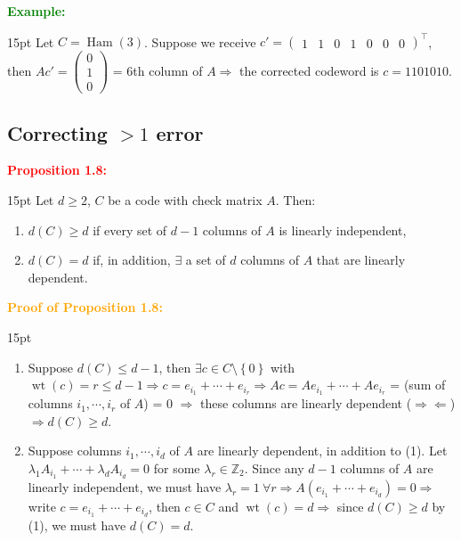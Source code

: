 \documentclass[12pt]{article}
\newcommand{\noparskip}{\vspace{-\parskip}}
\newenvironment{points}
	{\begin{enumerate}[label = (\arabic*)]}
	{\end{enumerate}}
\newenvironment{dent}
	{\begin{adjustwidth}{15pt}{}\noparskip}
	{\end{adjustwidth}}
\newenvironment{result}[1]
	{\textcolor{Red}{\textbf{#1:}}\begin{dent}}
	{\end{dent}}
\newenvironment{proof}[1]
	{\textcolor{Orange}{\textbf{Proof of #1:}}\begin{dent}}
	{\end{dent}}
\newenvironment{example}
	{\textcolor{Green}{\textbf{Example:}}\begin{dent}}
	{\end{dent}}
\renewcommand{\implies}{\Rightarrow}
\newcommand{\contradiction}{\Rightarrow \Leftarrow}
\newcommand{\set}[1]{\left\{ #1 \right\}}
\newcommand{\Z}{\mathbb{Z}}
\newcommand{\wt}[1]{\operatorname{wt}(#1)}
\newcommand{\Ham}[1]{\operatorname{Ham}(#1)}
\begin{document}
\begin{example}
Let $C = \Ham{3}$. Suppose we receive $c' = \begin{pmatrix} 1 & 1 & 0 & 1 & 0 & 0 & 0 \end{pmatrix}^\top$, then $Ac' = \begin{pmatrix} 0 \\ 1 \\ 0 \end{pmatrix}$ = 6th column of $A \implies$ the corrected codeword is $c = 1101010$.
\end{example}

\subsection{Correcting $> 1$ error}

\begin{result}{Proposition 1.8}
Let $d \ge 2$, $C$ be a code with check matrix $A$. Then:
\noparskip
\begin{points}
\item $d(C) \ge d$ if every set of $d - 1$ columns of $A$ is linearly independent,
\item $d(C) = d$ if, in addition, $\exists$ a set of $d$ columns of $A$ that are linearly dependent.
\end{points}
\end{result}

\begin{proof}{Proposition 1.8}
\begin{points}
\item Suppose $d(C) \le d - 1$, then $\exists c \in C \setminus \set{0}$ with $\wt{c} = r \le d - 1 \implies c = e_{i_1} + \cdots + e_{i_r} \implies Ac = Ae_{i_1} + \cdots + Ae_{i_r}$ = (sum of columns $i_1, \cdots, i_r$ of $A$) = 0 $\implies$ these columns are linearly dependent ($\contradiction$) $\implies d(C) \ge d$.
\item Suppose columns $i_1, \cdots, i_d$ of $A$ are linearly dependent, in addition to (1). Let $\lambda_1 A_{i_1} + \cdots + \lambda_d A_{i_d} = 0$ for some $\lambda_r \in \Z_2$. Since any $d - 1$ columns of $A$ are linearly independent, we must have $\lambda_r = 1\ \forall r \implies A(e_{i_1} + \cdots + e_{i_d}) = 0 \implies$ write $c = e_{i_1} + \cdots + e_{i_d}$, then $c \in C$ and $\wt{c} = d \implies$ since $d(C) \ge d$ by (1), we must have $d(C) = d$.
\end{points}
\end{proof}
\end{document}
